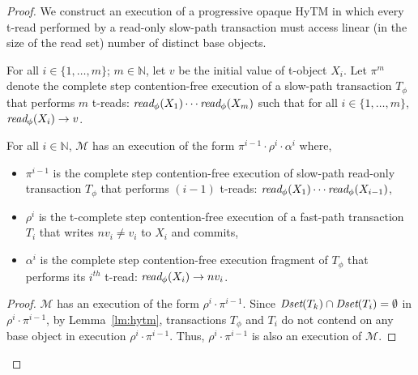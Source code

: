 \begin{proof}
We construct an execution of a progressive opaque HyTM in which every t-read performed by a read-only slow-path transaction
must access linear (in the size of the read set) number of distinct base objects.

For all $i\in \{1,\ldots , m\}$; $m \in \mathbb{N}$, let 
$v$ be the initial value of t-object $X_i$.
Let $\pi^{m}$ denote the complete step contention-free execution of a slow-path transaction
$T_{\phi}$ that performs ${m}$ t-reads: $\textit{read}_{\phi}(X_1)\cdots \textit{read}_{\phi}(X_{m})$
such that for all $i\in \{1,\ldots , m \}$, $\textit{read}_{\phi}(X_i) \rightarrow v$.
%
\begin{claim}
\label{cl:readdap}
For all $i\in \mathbb{N}$, $\mathcal{M}$ has an execution of the form $\pi^{i-1}\cdot \rho^i\cdot \alpha^i$ where,
%
\begin{itemize}
\item
$\pi^{i-1}$ is the complete step contention-free execution of slow-path read-only transaction $T_{\phi}$ that performs
$(i-1)$ t-reads: $\textit{read}_{\phi}(X_1)\cdots \textit{read}_{\phi}(X_{i-1})$,
\item
$\rho^i$ is the t-complete step contention-free execution of a fast-path transaction $T_{i}$
that writes $nv_i\neq v_i$ to $X_i$ and commits,
\item
$\alpha^i$ is the complete step contention-free execution fragment of $T_{\phi}$ that performs its $i^{th}$ t-read:
$\textit{read}_{\phi}(X_i) \rightarrow nv_i$.
\end{itemize}
%
\end{claim}
%
\begin{proof}
%
$\mathcal{M}$ has an execution of the form $\rho^i\cdot \pi^{i-1}$.
Since $\textit{Dset}(T_k) \cap \textit{Dset}(T_{i}) =\emptyset$ in $\rho^i\cdot \pi^{i-1}$,
by Lemma~\ref{lm:hytm}, transactions $T_{\phi}$ and $T_i$ do not contend
on any base object in execution $\rho^i\cdot \pi^{i-1}$.
Thus, $\rho^i\cdot \pi^{i-1}$ is also an execution of $\mathcal{M}$.


\end{proof}
\end{proof}
